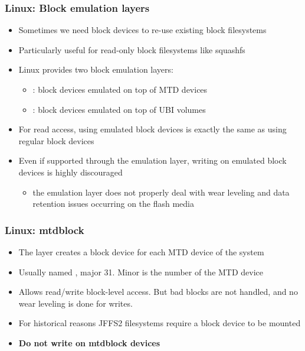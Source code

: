 \begin{frame}
  \frametitle{Linux: Block emulation layers}
  \begin{itemize}
  \item Sometimes we need block devices to re-use existing block
    filesystems
  \item Particularly useful for read-only block filesystems like squashfs
  \item Linux provides two block emulation layers:
    \begin{itemize}
    \item {}: block devices emulated on top of MTD devices
    \item {}: block devices emulated on top of UBI volumes
    \end{itemize}
  \item For read access, using emulated block devices is exactly the same
    as using regular block devices
  \item Even if supported through the  emulation layer,
    writing on emulated block devices is highly discouraged
    \begin{itemize}
    \item the emulation layer does not properly deal with wear
      leveling and data retention issues occurring on the flash media
    \end{itemize}
  \end{itemize}
\end{frame}

\begin{frame}
  \frametitle{Linux: mtdblock}
  \begin{itemize}
  \item The  layer creates a block device for each MTD
    device of the system
  \item Usually named , major 31. Minor is the
    number of the MTD device
  \item Allows read/write block-level access. But bad blocks are not
    handled, and no wear leveling is done for writes.
  \item For historical reasons JFFS2 filesystems require a block device
    to be mounted
  \item {\bf Do not write on mtdblock devices}
  \end{itemize}
\end{frame}


